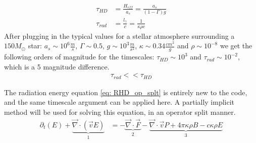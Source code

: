 \begin{align}
\tau_{HD} &= \frac{H_{eff}}{a_s}= \frac{a_s}{(1-\Gamma)g} \\
\tau_{rad} &= \frac{l_\gamma}{c} = \frac{1}{\kappa \rho c}
\end{align}
After plugging in the typical values for a stellar atmosphere surrounding a $150 M_\odot$ star: $a_s \sim 10^6 \frac{m}{s}$, $\Gamma \sim 0.5$, $g \sim 10^3 \frac{m}{s^2}$, $\kappa \sim 0.34 \frac{cm^2}{g}$ and $\rho \sim 10^{-8}$ we get the following orders of magnitude for the timescales: $\tau_{HD} \sim 10^{3}$ and $\tau_{rad} \sim 10^{-2} $, which is a 5 magnitude difference.
\begin{align}
\tau_{rad} << \tau_{HD}
\end{align} 

The radiation energy equation \eqref{eq: RHD_op_splt} is entirely new to the code, and the same timescale argument can be applied here. A partially implicit method will be used for solving this equation, in an operator split manner. \\

\begin{align}
\partial_t \left(E \right) + \underbrace{\vec{\nabla} \cdot \left( \vec{v} E \right)}_{1}  &= - \underbrace{\vec{\nabla} \cdot \vec{F}}_{2} - \underbrace{\vec{\nabla} \cdot \vec{v} P + 4\pi \kappa\rho B - c \kappa \rho E}_{3} \label{eq: RHD_op_splt}\\
\end{align} 

